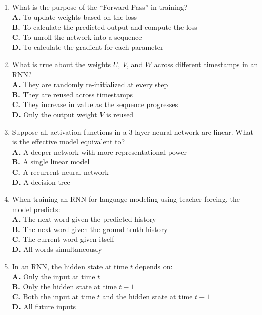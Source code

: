 \documentclass[11pt]{article}
\begin{document}
\begin{enumerate}[label=Q\arabic*., leftmargin=*]
\item What is the purpose of the ``Forward Pass'' in training?\\
\textbf{A.} To update weights based on the loss\\
\textbf{B.} To calculate the predicted output and compute the loss\\
\textbf{C.} To unroll the network into a sequence\\
\textbf{D.} To calculate the gradient for each parameter

\item What is true about the weights $U$, $V$, and $W$ across different timestamps in an RNN?\\
\textbf{A.} They are randomly re-initialized at every step\\
\textbf{B.} They are reused across timestamps\\
\textbf{C.} They increase in value as the sequence progresses\\
\textbf{D.} Only the output weight $V$ is reused

\item Suppose all activation functions in a 3-layer neural network are linear. What is the effective model equivalent to?\\
\textbf{A.} A deeper network with more representational power\\
\textbf{B.} A single linear model\\
\textbf{C.} A recurrent neural network\\
\textbf{D.} A decision tree

\item When training an RNN for language modeling using teacher forcing, the model predicts:\\
\textbf{A.} The next word given the predicted history\\
\textbf{B.} The next word given the ground-truth history\\
\textbf{C.} The current word given itself\\
\textbf{D.} All words simultaneously

\item In an RNN, the hidden state at time $t$ depends on:\\
\textbf{A.} Only the input at time $t$\\
\textbf{B.} Only the hidden state at time $t-1$\\
\textbf{C.} Both the input at time $t$ and the hidden state at time $t-1$\\
\textbf{D.} All future inputs


\end{enumerate}
\end{document}
